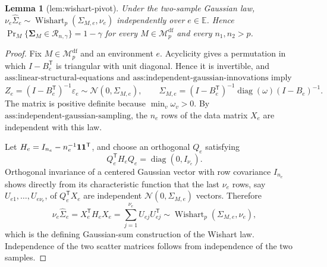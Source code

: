 \documentclass{article}
\newtheorem{lemma}{Lemma}
\begin{document}
\begin{lemma}[lem:wishart-pivot]\label{lem:wishart-pivot}
Under the two-sample Gaussian law, \(\nu_e\widehat\Sigma_e\sim\operatorname{Wishart}_p(\Sigma_{M,e},\nu_e)\) independently over \(e\in\mathbb E\). Hence \(\Pr_M\{\boldsymbol\Sigma_M\in\mathcal R_{n,\gamma}\}=1-\gamma\) for every \(M\in\mathcal M_p^{\mathrm{df}}\) and every \(n_1,n_2>p\).
\end{lemma}
\begin{proof}
Fix \(M\in\mathcal M_p^{\mathrm{df}}\) and an environment \(e\).  Acyclicity gives a permutation in which \(I-B_e^{\mathsf T}\) is triangular with unit diagonal.  Hence it is invertible, and \(\text{ass:linear-structural-equations}\) and \(\text{ass:independent-gaussian-innovations}\) imply
\[
 Z_e=(I-B_e^{\mathsf T})^{-1}\varepsilon_e
 \sim\mathcal N(0,\Sigma_{M,e}),\qquad
 \Sigma_{M,e}=(I-B_e^{\mathsf T})^{-1}
          \operatorname{diag}(\omega)(I-B_e)^{-1}.
\]
The matrix is positive definite because \(\min_v\omega_v>0\).  By \(\text{ass:independent-gaussian-sampling}\), the \(n_e\) rows of the data matrix \(X_e\) are independent with this law.

Let \(H_e=I_{n_e}-n_e^{-1}{\bf 1}{\bf 1}^{\mathsf T}\), and choose an orthogonal \(Q_e\) satisfying
\[
 Q_e^{\mathsf T}H_eQ_e=\operatorname{diag}(0,I_{\nu_e}).
\]
Orthogonal invariance of a centered Gaussian vector with row covariance \(I_{n_e}\) shows directly from its characteristic function that the last \(\nu_e\) rows, say \(U_{e1},\ldots,U_{e\nu_e}\), of \(Q_e^{\mathsf T}X_e\) are independent \(\mathcal N(0,\Sigma_{M,e})\) vectors.  Therefore
\[
 \nu_e\widehat\Sigma_e=X_e^{\mathsf T}H_eX_e
   =\sum_{j=1}^{\nu_e}U_{ej}U_{ej}^{\mathsf T}
   \sim\operatorname{Wishart}_p(\Sigma_{M,e},\nu_e),
\]
which is the defining Gaussian-sum construction of the Wishart law.  Independence of the two scatter matrices follows from independence of the two samples.


\end{proof}
\end{document}
